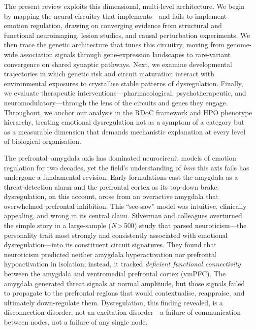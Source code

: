 The present review exploits this dimensional, multi-level architecture.  We
begin by mapping the neural circuitry that implements---and fails to
implement---emotion regulation, drawing on converging evidence from
structural and functional neuroimaging, lesion studies, and causal
perturbation experiments.  We then trace the genetic architecture that
tunes this circuitry, moving from genome-wide association signals through
gene-expression landscapes to rare-variant convergence on shared synaptic
pathways.  Next, we examine developmental trajectories in which genetic risk
and circuit maturation interact with environmental exposures to crystallise
stable patterns of dysregulation.  Finally, we evaluate therapeutic
interventions---pharmacological, psychotherapeutic, and
neuromodulatory---through the lens of the circuits and genes they engage.
Throughout, we anchor our analysis in the RDoC framework and HPO phenotype
hierarchy, treating emotional dysregulation not as a symptom of a category
but as a measurable dimension that demands mechanistic explanation at every
level of biological organisation.



The prefrontal--amygdala axis has dominated neurocircuit models of emotion
regulation for two decades, yet the field's understanding of \emph{how}
this axis fails has undergone a fundamental revision.  Early formulations
cast the amygdala as a threat-detection alarm and the prefrontal cortex as
its top-down brake: dysregulation, on this account, arose from an
overactive amygdala that overwhelmed prefrontal inhibition.  This ``see-saw''
model was intuitive, clinically appealing, and wrong in its central claim.
Silverman and colleagues overturned the simple story in a large-sample
(\emph{N}\,>\,500) study that parsed neuroticism---the personality trait
most strongly and consistently associated with emotional
dysregulation---into its constituent circuit signatures.\cite{silverman2019}  They found
that neuroticism predicted neither amygdala hyperactivation nor prefrontal
hypoactivation in isolation; instead, it tracked \emph{deficient functional
connectivity} between the amygdala and ventromedial prefrontal cortex
(vmPFC).  The amygdala generated threat signals at normal amplitude, but
those signals failed to propagate to the prefrontal regions that would
contextualise, reappraise, and ultimately down-regulate them.
Dysregulation, this finding revealed, is a disconnection disorder, not an
excitation disorder---a failure of communication between nodes, not a
failure of any single node.

